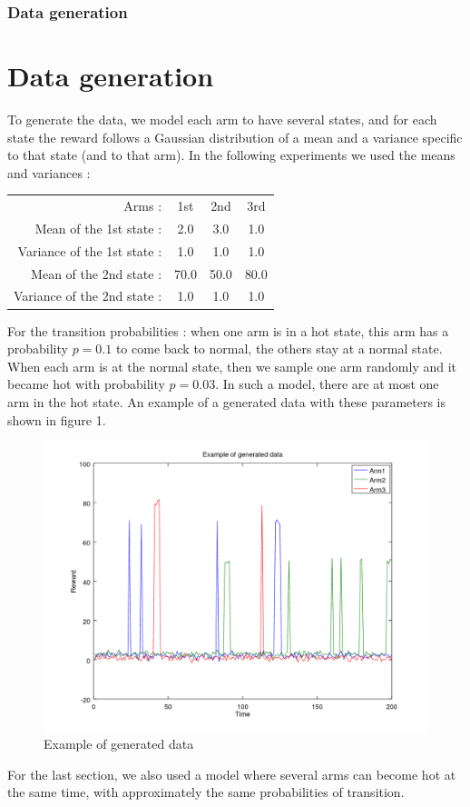 \documentclass[french]{beamer}
\begin{document}
	\begin{frame}
	\frametitle{Data generation}
	\section{Data generation}
	
	To generate the data, we model each arm to have several states, and for each state the reward follows a Gaussian distribution of a mean and a variance specific to that state (and to that arm). In the following experiments we used the means and variances :
	\begin{center}
		\begin{tabular}{rccc}
			Arms : & 1st & 2nd & 3rd \\
			Mean of the 1st state : & 2.0 & 3.0 & 1.0 \\
			Variance of the 1st state : & 1.0 & 1.0 & 1.0 \\
			Mean of the 2nd state : & 70.0 & 50.0 & 80.0 \\
			Variance of the 2nd state : & 1.0 & 1.0 & 1.0 \\
		\end{tabular}
	\end{center}
	For the transition probabilities : when one arm is in a hot state, this arm has a probability $p=0.1$ to come back to normal, the others stay at a normal state. When each arm is at the normal state, then we sample one arm randomly and it became hot with probability $p=0.03$. In such a model, there are at most one arm in the hot state. An example of a generated data with these parameters is shown in figure 1.
	\newline
	
	\begin{figure}[h]
		\begin{center}
			\includegraphics[width=0.7\linewidth]{generated_data_one.png}
		\end{center}
		\caption{Example of generated data}
	\end{figure}
	
	For the last section, we also used a model where several arms can become hot at the same time, with approximately the same probabilities of transition.
	
\end{frame}
\end{document}
